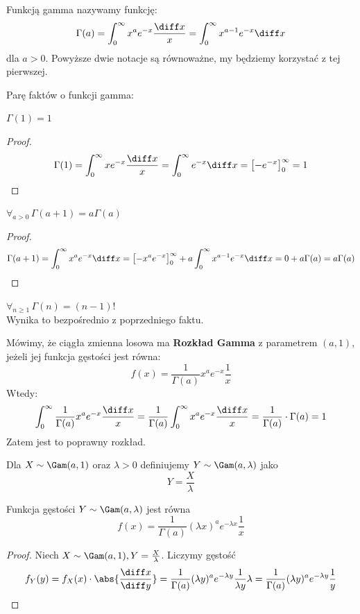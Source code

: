 \begin{definition}
    Funkcją gamma nazywamy funkcję:
    \[
        \Gamma(a) = \int_0^{\infty} x^a e^{-x} \frac{\diff x}{x} = \int_0^{\infty} x^{a-1} e^{-x} \diff x
    \]
    dla \( a > 0 \).
    Powyższe dwie notacje są równoważne, my będziemy korzystać z tej pierwszej.
\end{definition}

Parę faktów o funkcji gamma:
\begin{fact}
    \( \Gamma(1) = 1 \)
\end{fact}
\begin{proof}
    \[
        \Gamma(1) = \int_0^{\infty} x e^{-x} \frac{\diff x}{x} = \int_0^{\infty} e^{-x} \diff x = \left[-e^{-x} \right]_0^{\infty} = 1
    \]
\end{proof}

\begin{fact}
    \( \forall_{a > 0} \, \Gamma(a+1) = a\Gamma(a) \)
\end{fact}
\begin{proof}
    \[
        \Gamma(a+1) = \int_0^{\infty} x^a e^{-x} \diff x = \left[ -x^a e^{-x}  \right]_0^{\infty} + a\int_0^{\infty} x^{a-1} e^{-x} \diff x = 0 + a\Gamma(a) = a\Gamma(a)
    \]
\end{proof}

\begin{fact}
    \( \forall_{n \geq 1} \, \Gamma(n) = (n-1)! \) \\
    Wynika to bezpośrednio z poprzedniego faktu.
\end{fact}

\begin{definition} 
    Mówimy, że ciągła zmienna losowa ma \textbf{Rozkład Gamma} z parametrem \( (a, 1) \), jeżeli jej funkcja gęstości jest równa:
    \[
        f(x) = \frac{1}{\Gamma(a)} x^a e^{-x} \frac{1}{x}
    \]
    Wtedy:
    \[
        \int_0^{\infty} \frac{1}{\Gamma(a)}x^a e^{-x} \frac{\diff x}{x} = \frac{1}{\Gamma(a)} \int_0^{\infty} x^a e^{-x} \frac{\diff x}{x} = \frac{1}{\Gamma(a)} \cdot \Gamma(a) = 1
    \]
    Zatem jest to poprawny rozkład.
\end{definition}

\begin{definition}
	Dla \(X \sim \Gam(a, 1)\) oraz \(\lambda > 0\) definiujemy \(Y \sim \Gam(a, \lambda)\) jako
	\[
		Y = \frac{X}{\lambda}
	\]
\end{definition}

\begin{theorem}
	Funkcja gęstości \(Y \sim \Gam(a, \lambda)\) jest równa
	\[
        f(x) = \frac{1}{\Gamma(a)} (\lambda x)^a e^{-\lambda x} \frac{1}{x}
    \]
\end{theorem}
\begin{proof}
	Niech \( X \sim \Gam(a, 1), Y = \frac{X}{\lambda} \). Liczymy gęstość
    \[
        f_Y(y) = f_X(x) \cdot \abs{\frac{\diff x}{\diff y}} = \frac{1}{\Gamma(a)}(\lambda y)^a e^{-\lambda y} \frac{1}{\lambda y} \lambda = \frac{1}{\Gamma(a)}(\lambda y)^a e^{-\lambda y} \frac{1}{y}
    \]
\end{proof}

